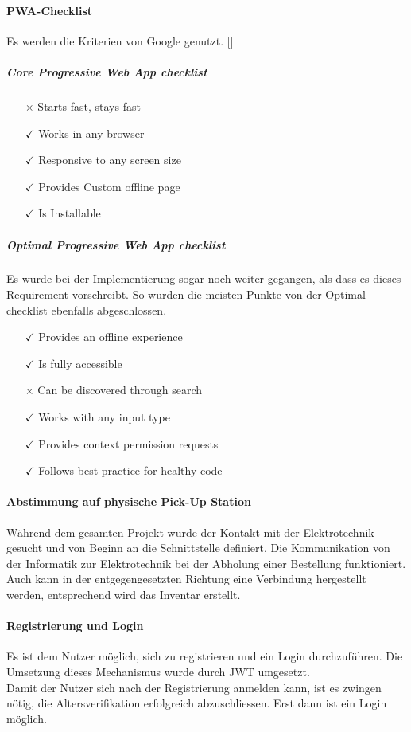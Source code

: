 \paragraph{PWA-Checklist}
Es werden die Kriterien von Google genutzt. [\cite{pwaChecklist}]
\subparagraph{Core Progressive Web App checklist}
\begin{itemize}
	\item [{$\times$}] Starts fast, stays fast
	\item [{$\checkmark$}] Works in any browser
	\item [{$\checkmark$}] Responsive to any screen size
	\item [{$\checkmark$}] Provides Custom offline page
	\item [{$\checkmark$}] Is Installable
\end{itemize}
\subparagraph{Optimal Progressive Web App checklist}
Es wurde bei der Implementierung sogar noch weiter gegangen, als dass es dieses Requirement vorschreibt. So wurden die meisten Punkte von der Optimal checklist ebenfalls abgeschlossen. 
\begin{itemize}
	\item [{$\checkmark$}] Provides an offline experience
	\item [{$\checkmark$}] Is fully accessible
	\item [{$\times$}] Can be discovered through search
	\item [{$\checkmark$}] Works with any input type
	\item [{$\checkmark$}] Provides context permission requests
	\item [{$\checkmark$}] Follows best practice for healthy code
\end{itemize}

\paragraph{Abstimmung auf physische Pick-Up Station}
Während dem gesamten Projekt wurde der Kontakt mit der Elektrotechnik gesucht und von Beginn an die Schnittstelle definiert. Die Kommunikation von der Informatik zur Elektrotechnik bei der Abholung einer Bestellung funktioniert. Auch kann in der entgegengesetzten Richtung eine Verbindung hergestellt werden, entsprechend wird das Inventar erstellt. 

\paragraph{Registrierung und Login}
Es ist dem Nutzer möglich, sich zu registrieren und ein Login durchzuführen. Die Umsetzung dieses Mechanismus wurde durch \ac{JWT} umgesetzt. \\
Damit der Nutzer sich nach der Registrierung anmelden kann, ist es zwingen nötig, die Altersverifikation erfolgreich abzuschliessen. Erst dann ist ein Login möglich. 

